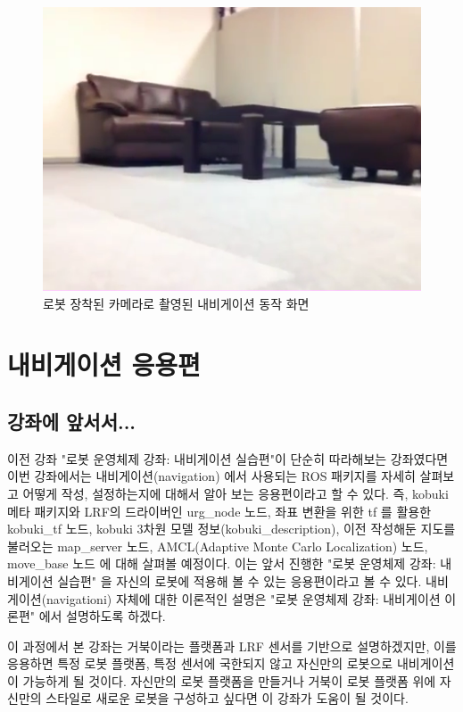 \begin{figure}[h]
\centering
\includegraphics[width=0.5\columnwidth]{pictures/chapter11/navigation_camera.png}
\caption{로봇 장착된 카메라로 촬영된 내비게이션 동작 화면}
\end{figure}

\section{내비게이션 응용편}

\subsection{강좌에 앞서서...}

이전 강좌 "로봇 운영체제 강좌: 내비게이션 실습편"이 단순히 따라해보는 강좌였다면 이번 강좌에서는 내비게이션(navigation) 에서 사용되는 ROS 패키지를 자세히 살펴보고 어떻게 작성, 설정하는지에 대해서 알아 보는 응용편이라고 할 수 있다. 즉, kobuki 메타 패키지와 LRF의 드라이버인 urg\_node 노드, 좌표 변환을 위한 tf 를 활용한 kobuki\_tf 노드, kobuki 3차원 모델 정보(kobuki\_description), 이전 작성해둔 지도를 불러오는 map\_server 노드, AMCL(Adaptive Monte Carlo Localization) 노드, move\_base 노드 에 대해 살펴볼 예정이다. 이는 앞서 진행한 "로봇 운영체제 강좌: 내비게이션 실습편" 을 자신의 로봇에 적용해 볼 수 있는 응용편이라고 볼 수 있다. 내비게이션(navigationi) 자체에 대한 이론적인 설명은 "로봇 운영체제 강좌: 내비게이션 이론편" 에서 설명하도록 하겠다.

이 과정에서 본 강좌는 거북이라는 플랫폼과 LRF 센서를 기반으로 설명하겠지만, 이를 응용하면 특정 로봇 플랫폼, 특정 센서에 국한되지 않고 자신만의 로봇으로 내비게이션 이 가능하게 될 것이다. 자신만의 로봇 플랫폼을 만들거나 거북이 로봇 플랫폼 위에 자신만의 스타일로 새로운 로봇을 구성하고 싶다면 이 강좌가 도움이 될 것이다.

